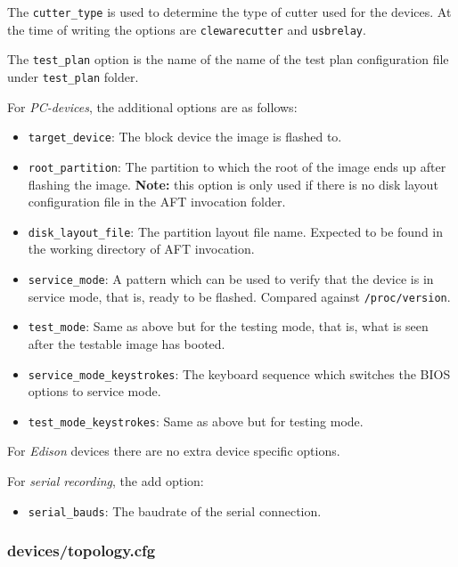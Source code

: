 \documentclass[a4paper,11pt]{article}
\newcommand{\note}{\textbf{Note: }}
\newcommand{\cmd}[1]{\texttt{#1}}
\begin{document}
The \cmd{cutter\_type} is used to determine the type of cutter used for the devices. At the time of writing the options are \cmd{clewarecutter} and \cmd{usbrelay}.

The \cmd{test\_plan} option is the name of the name of the test plan configuration file under \cmd{test\_plan} folder.

For \emph{PC-devices}, the additional options are as follows:
\begin{itemize}
\item \cmd{target\_device}: The block device the image is flashed to.

\item \cmd{root\_partition}: The partition to which the root of the image ends up after flashing the image. \note this option is only used if there is no disk layout configuration file in the AFT invocation folder.

\item \cmd{disk\_layout\_file}: The partition layout file name. Expected to be found in the working directory of AFT invocation.

\item \cmd{service\_mode}: A pattern which can be used to verify that the device is in service mode, that is, ready to be flashed. Compared against \cmd{/proc/version}.

\item \cmd{test\_mode}: Same as above but for the testing mode, that is, what is seen after the testable image has booted.

\item \cmd{service\_mode\_keystrokes}: The keyboard sequence which switches the BIOS options to service mode.

\item \cmd{test\_mode\_keystrokes}: Same as above but for testing mode.
\end{itemize}

For \emph{Edison} devices there are no extra device specific options.

For \emph{serial recording}, the add option:
\begin{itemize}
	\item \cmd{serial\_bauds}: The baudrate of the serial connection.
\end{itemize}

\subsubsection*{devices/topology.cfg}
\end{document}
